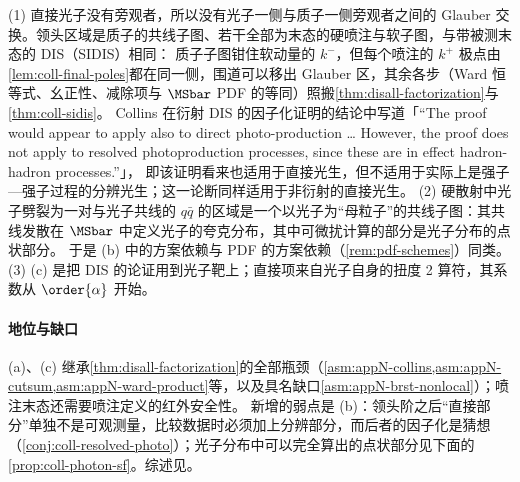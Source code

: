 \begin{proofsketch}
(1) 直接光子没有旁观者，所以没有光子一侧与质子一侧旁观者之间的 Glauber 交换。领头区域是质子的共线子图、若干全部为末态的硬喷注与软子图，与带被测末态的 DIS（SIDIS）相同：
质子子图钳住软动量的 $k^-$，但每个喷注的 $k^+$ 极点由\cref{lem:coll-final-poles}都在同一侧，围道可以移出 Glauber 区，其余各步（Ward 恒等式、幺正性、减除项与 $\MSbar$ PDF 的等同）照搬\cref{thm:disall-factorization}与\cref{thm:coll-sidis}。
Collins 在衍射 DIS 的因子化证明的结论中写道「“The proof would appear to apply also to direct photo-production \ldots{} However, the proof does not apply to resolved photoproduction processes, since these are in effect hadron-hadron processes.”」\cite{Collins1998a}，
即该证明看来也适用于直接光生，但不适用于实际上是强子—强子过程的分辨光生；这一论断同样适用于非衍射的直接光生。
(2) 硬散射中光子劈裂为一对与光子共线的 $q\bar q$ 的区域是一个以光子为“母粒子”的共线子图：其共线发散在 $\MSbar$ 中定义光子的夸克分布，其中可微扰计算的部分是光子分布的点状部分。
于是 (b) 中的方案依赖与 PDF 的方案依赖（\cref{rem:pdf-schemes}）同类。(3) (c) 是把 DIS 的论证用到光子靶上；直接项来自光子自身的扭度 2 算符，其系数从 $\order{\alpha}$ 开始。
\end{proofsketch}

\paragraph{地位与缺口}
(a)、(c) 继承\cref{thm:disall-factorization}的全部瓶颈（\cref{asm:appN-collins,asm:appN-cutsum,asm:appN-ward-product}等，以及具名缺口\cref{asm:appN-brst-nonlocal}）；喷注末态还需要喷注定义的红外安全性。
新增的弱点是 (b)：领头阶之后“直接部分”单独不是可观测量，比较数据时必须加上分辨部分，而后者的因子化是猜想（\cref{conj:coll-resolved-photo}）；光子分布中可以完全算出的点状部分见下面的\cref{prop:coll-photon-sf}。综述见\cite{Klasen:2002xb}。

